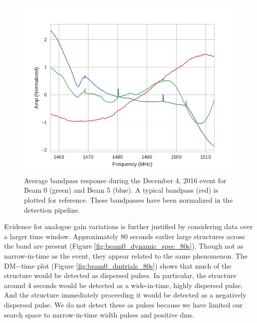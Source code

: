 \documentclass[a4paper,fleqn,usenatbib]{mnras}
\begin{document}
\begin{figure}
    \includegraphics[width=1.0\linewidth]{figures/bandpass_response.pdf}
    \caption{Average bandpass response during the December 4, 2016 event for
    Beam 0 (green) and Beam 5 (blue). A typical bandpass (red) is plotted for
    reference. These bandpasses have been normalized in the detection pipeline.
    }
    \label{fig:bandpass_response}
\end{figure}

Evidence for analogue gain variations is further justified by considering data
over a larger time window.  Approximately 80 seconds earlier large structures
across the band are present (Figure \ref{fig:beam0_dynamic_spec_80s}). Though
not as narrow-in-time as the event, they appear related to the same phenomenon.
The DM$-$time plot (Figure \ref{fig:beam0_dmtrials_80s}) shows that much of the
structure would be detected as dispersed pulses.  In particular, the structure
around 4 seconds would be detected as a wide-in-time, highly dispersed pulse.
And the structure immediately proceeding it would be detected as a negatively
dispersed pulse.  We do not detect these as pulses because we have limited our
search space to narrow-in-time width pulses and positive \glspl{dm}.
\end{document}
